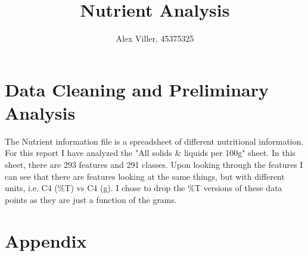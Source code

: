 \documentclass[12pt,a4paper]{article}
\title{Nutrient Analysis}
\author{Alex Viller, 45375325}
\date{}
\begin{document}
    \maketitle

    \tableofcontents{}

    \clearpage

    \section{Data Cleaning and Preliminary Analysis}
    The Nutrient information file is a spreadsheet of different nutritional
    information. For this report I have analyzed the "All solids \& liquids per
    100g" sheet. In this sheet, there are 293 features and 291 classes. Upon
    looking through the features I can see that there are features looking at
    the same things, but with different units, i.e. C4 (\%T) vs C4 (g). I chose to
    drop the \%T versions of these data points as they are just a function of
    the grams. 

    \clearpage
    \section{Appendix}
\end{document}
